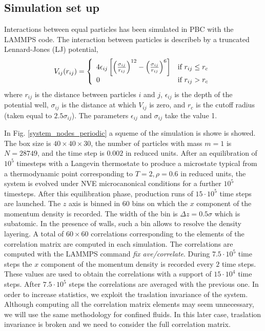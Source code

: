 \documentclass[a4paper,openright,12pt]{book}
\begin{document}
\subsection{Simulation set up}
\label{Sec:SimSetUpPBC}
Interactions between equal particles has been simulated in PBC with the LAMMPS code. The interaction between particles is describeb by a truncated Lennard-Jones (LJ) potential,
\begin{align}
  V_{ij}(r_{ij}) = \left\lbrace
  \begin{array}{ll}
    4\epsilon_{ij}\left[\left(\frac{\sigma_{ij}}{r_{ij}}\right)^{12}-\left(\frac{\sigma_{ij}}{r_{ij}}\right)^6\right] & \textup{if } r_{ij}\leq r_c \\
    0 & \textup{if } r_{ij}>r_c
  \end{array}
  \right.
  \label{LJ}
\end{align}
where $r_{ij}$ is the distance between particles $i$ and $j$, $\epsilon_{ij}$ is the depth of the potential well, $\sigma_{ij}$ is the distance at which $V_{ij}$ is zero, and $r_c$ is the cutoff radius (taken equal to $2.5\sigma_{ij}$). The parameters $\epsilon_{ij}$ and $\sigma_{ij}$ take the value 1. 

In Fig. \ref{system_nodes_periodic} a squeme of the simulation is showe is showed.
The box  size is $40\times40\times30$, the  number of particles with mass $m=1$
is $N=28749$, and the time step is $0.002$ in reduced units.  After an
equilibration  of  $10^5$ timesteps  with  a  Langevin thermostate  to
produce a microstate typical  from a thermodynamic point corresponding
to $T=2,\rho=0.6$ in  reduced units, the system is  evolved under NVE
microcanonical conditions for a  further $10^5$ timesteps.  After this
equilibration  phase,  production  runs   of  $15\cdot 10^5$  time  steps  are
launched.   The $z$  axis is  binned  in $60$  bins on  which the  $x$
component of the momentum density is recorded.  The
width of the  bin is $\Delta z=0.5\sigma$ which is  subatomic.  In the
presence of walls,  such a bin allows to resolve  the density layering.  A total of $60\times  60$ correlations corresponding to the
elements of  the correlation matrix  are computed in  each simulation.
The correlations are computed with the LAMMPS command {\it fix ave/correlate}. During $7.5\cdot 10^5$ time steps the $x$ component of the momentum density is recorded every $2$ time steps. These values are used to obtain the correlations with a support of $15\cdot10^4$ time steps. %
After $7.5\cdot 10^5$ steps the correlations are averaged with the previous one. 
In  order to  increase  statistics,  we 
exploit   the   traslation   invariance   of   the
system.  Although computing  all the  correlation matrix  elements may
seem  unnecessary,  we will  use  the  same methodology  for  confined
fluids. In  this later  case, traslation invariance  is broken  and we
need to consider the full correlation matrix.
\end{document}
